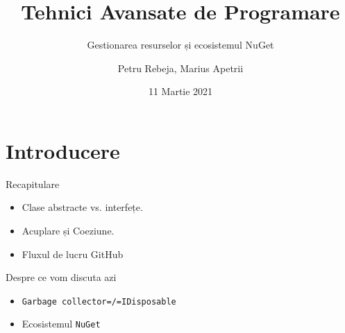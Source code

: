 \documentclass[presentation]{beamer}
\author{Petru Rebeja, Marius Apetrii}
\date{11 Martie 2021}
\title{Tehnici Avansate de Programare}
\subtitle{Gestionarea resurselor și ecosistemul NuGet}
\institute[UAIC]{Facultatea de Matematică\\Universitatea Alexandru Ioan Cuza, Iași}
\begin{document}
\maketitle
\section{Introducere}
\label{sec:org8410815}
\begin{frame}[label={sec:org5d6059e}]{Recapitulare}
\begin{itemize}
\item Clase abstracte vs. interfețe.
\item Acuplare și Coeziune.
\item Fluxul de lucru GitHub
\end{itemize}
\end{frame}
\begin{frame}[label={sec:org60f68bf},fragile]{Despre ce vom discuta azi}
 \begin{itemize}
\item \texttt{Garbage collector=/=IDisposable}
\item Ecosistemul \texttt{NuGet}
\end{itemize}
\end{frame}
\end{document}
